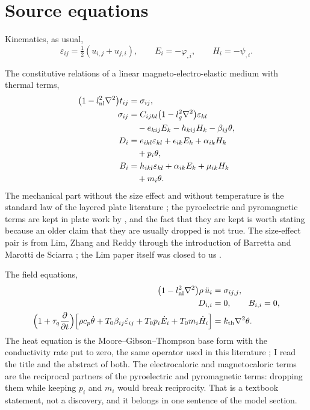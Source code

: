 \documentclass[11pt]{article}
\begin{document}
\section{Source equations}\label{sec:source}

Kinematics, as usual,
\begin{equation}
\varepsilon_{ij}=\tfrac12(u_{i,j}+u_{j,i}),\qquad E_i=-\varphi_{,i},\qquad H_i=-\psi_{,i}.
\end{equation}

The constitutive relations of a linear magneto-electro-elastic medium with thermal terms,
\begin{align}
\bigl(1-l_{\rm nl}^2\nabla^2\bigr)t_{ij}&=\sigma_{ij}, \\
\sigma_{ij}&=C_{ijkl}\bigl(1-l_g^2\nabla^2\bigr)\varepsilon_{kl} \nonumber\\
&\quad -e_{kij}E_k-h_{kij}H_k-\beta_{ij}\theta,\label{eq:C1} \\
D_i&=e_{ikl}\varepsilon_{kl}+\epsilon_{ik}E_k+\alpha_{ik}H_k \nonumber\\
&\quad +p_i\theta,\label{eq:C2} \\
B_i&=h_{ikl}\varepsilon_{kl}+\alpha_{ik}E_k+\mu_{ik}H_k \nonumber\\
&\quad +m_i\theta .\label{eq:C3}
\end{align}
The mechanical part without the size effect and without temperature is the standard law of the layered
plate literature \cite{Chen2007}; the pyroelectric and pyromagnetic terms are kept in plate work by
\cite{Kondaiah2013,Tocci2021}, and the fact that they are kept is worth stating because an older claim
that they are usually dropped is not true. The size-effect pair is from Lim, Zhang and Reddy through the
introduction of Barretta and Marotti de Sciarra \cite[Eqs.~(18)--(19)]{Barretta2018}; the Lim paper itself
was closed to us \cite{Lim2015}.

The field equations,
\begin{align}
\bigl(1-l_{\rm nl}^2\nabla^2\bigr)\rho\,\ddot u_i&=\sigma_{ij,j},\label{eq:mom}\\
D_{i,i}&=0,\qquad B_{i,i}=0,\label{eq:gauss}\\
\Bigl(1+\tau_q\frac{\partial}{\partial t}\Bigr)
\Bigl[\rho c_p\dot\theta+T_0\beta_{ij}\dot\varepsilon_{ij}
+T_0p_i\dot E_i+T_0m_i\dot H_i\Bigr]&=k_{\rm th}\nabla^2\theta .\label{eq:heat}
\end{align}
The heat equation is the Moore--Gibson--Thompson base form with the conductivity rate put to zero, the same
operator used in this literature \cite{Matlam2026,Gupta2025}; I read the title and the abstract of both.
The electrocaloric and magnetocaloric terms are the reciprocal partners of the pyroelectric and
pyromagnetic terms: dropping them while keeping $p_i$ and $m_i$ would break reciprocity. That is a
textbook statement, not a discovery, and it belongs in one sentence of the model section.
\end{document}
